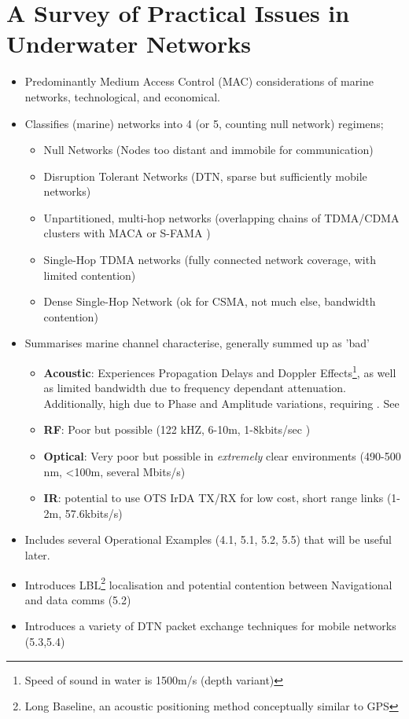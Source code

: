 \section{A Survey of Practical Issues in Underwater Networks
 \citet*{Partan2006}}
\label{Partan2006_gen}
\begin{itemize}
  \item Predominantly Medium Access Control (MAC) considerations of marine
  networks, technological, and economical.
  \item Classifies (marine) networks into 4 (or 5, counting null network)
  regimens; 
  \begin{itemize}
    \item Null Networks (Nodes too distant and immobile for communication)
    \item Disruption Tolerant Networks (DTN, sparse but sufficiently
    mobile networks)
    \item Unpartitioned, multi-hop networks (overlapping chains of TDMA/CDMA 
    clusters with MACA or S-FAMA \cite{Molins2006})
    \item Single-Hop TDMA networks (fully connected network coverage, with
    limited contention)
    \item Dense Single-Hop Network (ok for CSMA, not much else, bandwidth
    contention)
  \end{itemize}
  \item Summarises marine channel characterise, generally summed up as 'bad'
  \begin{itemize}
    \item \textbf{Acoustic}: Experiences Propagation Delays and
    Doppler Effects\footnote{Speed of sound in water is 1500m/s (depth
    variant)}, as well as limited bandwidth due to frequency dependant
    attenuation. Additionally, high  due to Phase and Amplitude
    variations, requiring . See \cite{Catipovic1990}
    \item \textbf{RF}: Poor but possible (122 kHZ, 6-10m, 1-8kbits/sec
    )
    \item \textbf{Optical}: Very poor but possible in \textit{extremely} clear
    environments (490-500 nm, \textless 100m, several Mbits/s)
    \item \textbf{IR}: potential to use OTS IrDA TX/RX for low cost,
    short range links (1-2m, 57.6kbits/s)
  \end{itemize}
  \item Includes several Operational Examples (4.1, 5.1, 5.2, 5.5) that will be
  useful later.
  \item Introduces LBL\footnote{Long Baseline, an acoustic positioning method
  conceptually similar to GPS} localisation and potential contention between
  Navigational and data comms (5.2)
  \item Introduces a variety of DTN packet exchange techniques for mobile
  networks (5.3,5.4)
\end{itemize}

